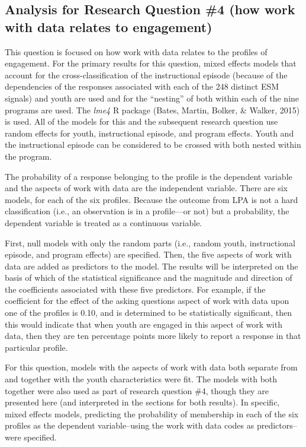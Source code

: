 \documentclass[]{book}
\theoremstyle{definition}
\theoremstyle{definition}
\theoremstyle{definition}
\theoremstyle{remark}
\begin{document}
\subsection{Analysis for Research Question \#4 (how work with data
relates to
engagement)}\label{analysis-for-research-question-4-how-work-with-data-relates-to-engagement}

This question is focused on how work with data relates to the profiles
of engagement. For the primary results for this question, mixed effects
models that account for the cross-classification of the instructional
episode (because of the dependencies of the responses associated with
each of the 248 distinct ESM signals) and youth are used and for the
``nesting'' of both within each of the nine programs are used. The
\emph{lme4} R package (Bates, Martin, Bolker, \& Walker, 2015) is used.
All of the models for this and the subsequent research question use
random effects for youth, instructional episode, and program effects.
Youth and the instructional episode can be considered to be crossed with
both nested within the program.

The probability of a response belonging to the profile is the dependent
variable and the aspects of work with data are the independent variable.
There are six models, for each of the six profiles. Because the outcome
from LPA is not a hard classification (i.e., an observation is in a
profile---or not) but a probability, the dependent variable is treated
as a continuous variable.

First, null models with only the random parts (i.e., random youth,
instructional episode, and program effects) are specified. Then, the
five aspects of work with data are added as predictors to the model. The
results will be interpreted on the basis of which of the statistical
significance and the magnitude and direction of the coefficients
associated with these five predictors. For example, if the coefficient
for the effect of the asking questions aspect of work with data upon one
of the profiles is 0.10, and is determined to be statistically
significant, then this would indicate that when youth are engaged in
this aspect of work with data, then they are ten percentage points more
likely to report a response in that particular profile.

For this question, models with the aspects of work with data both
separate from and together with the youth characteristics were fit. The
models with both together were also used as part of research question
\#4, though they are presented here (and interpreted in the sections for
both results). In specific, mixed effects models, predicting the
probability of membership in each of the six profiles as the dependent
variable--using the work with data codes as predictors--were specified.
\end{document}
